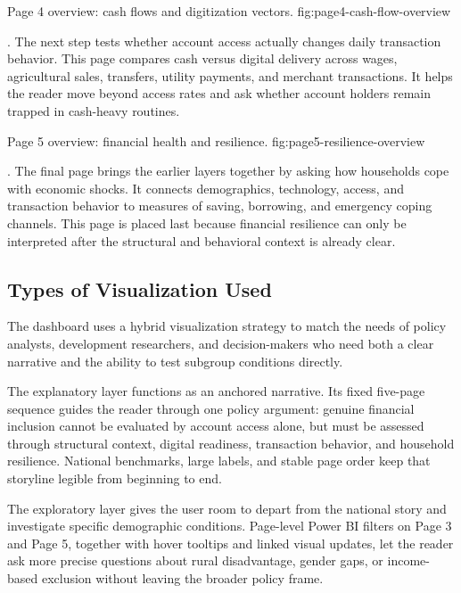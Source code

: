\documentclass[../main.tex]{subfiles}
\begin{document}
{Page 4 overview: cash flows and digitization vectors.}
{fig:page4-cash-flow-overview}

. The next
step tests whether account access actually changes daily transaction behavior.
This page compares cash versus digital delivery across wages, agricultural
sales, transfers, utility payments, and merchant transactions. It helps the
reader move beyond access rates and ask whether account holders remain trapped
in cash-heavy routines.

{Page 5 overview: financial health and resilience.}
{fig:page5-resilience-overview}

. The final
page brings the earlier layers together by asking how households cope with
economic shocks. It connects demographics, technology, access, and transaction
behavior to measures of saving, borrowing, and emergency coping channels. This
page is placed last because financial resilience can only be interpreted after
the structural and behavioral context is already clear.

\subsection{Types of Visualization Used}
\label{sec:dashboard-overview}

The dashboard uses a hybrid visualization strategy to match the needs of
policy analysts, development researchers, and decision-makers who need both a
clear narrative and the ability to test subgroup conditions directly.

The explanatory layer functions as an anchored narrative. Its fixed five-page
sequence guides the reader through one policy argument: genuine financial
inclusion cannot be evaluated by account access alone, but must be assessed
through structural context, digital readiness, transaction behavior, and
household resilience. National benchmarks, large labels, and stable page order
keep that storyline legible from beginning to end.

The exploratory layer gives the user room to depart from the national story and
investigate specific demographic conditions. Page-level Power BI filters on
Page 3 and Page 5, together with hover tooltips and linked visual updates, let
the reader ask more precise questions about rural disadvantage, gender gaps, or
income-based exclusion without leaving the broader policy frame.
\end{document}
